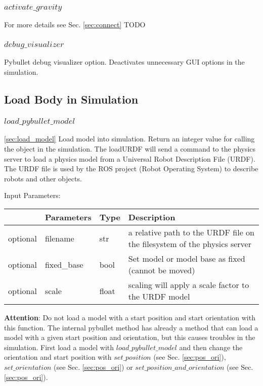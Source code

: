 \documentclass[
	ngerman,
	accentcolor=9c,%
	type=intern,
	marginpar=false
	]{tudapub}
\begin{document}
\subsubsection{$activate\_gravity$}
\noindent For more details see Sec. \ref{sec:connect} TODO


\subsubsection{$debug\_visualizer$}
\noindent Pybullet debug visualizer option. Deactivates unnecessary GUI options in the simulation.

\vspace{0.5cm} 




\subsection{Load Body in Simulation}
\subsubsection{$load\_pybullet\_model$}
\ref{sec:load_model}
\noindent Load model into simulation. Return an integer value for calling the object in the simulation. The loadURDF will send a command to the physics server to load a physics model from a Universal Robot Description File (URDF). The URDF file is used by the ROS project (Robot Operating System) to describe robots and other objects.


\vspace{0.5cm}
\noindent Input Parameters:
\vspace{0.5cm}

\begin{tabular}{|p{}|p{}|p{}| p{}|}
\hline
 & \textbf{Parameters} & \textbf{Type} & \textbf{Description} \\
\hline
optional & filename & str & a relative path to the URDF file on the filesystem of the physics server\\
\hline
optional & fixed\_base & bool & Set model or model base as fixed (cannot be moved)\\
\hline
optional & scale & float & scaling will apply a scale factor to the URDF model\\
\hline
\end{tabular}
\vspace{0.5cm}


\noindent \textbf{Attention}: Do not load a model with a start position and start orientation with this function. The internal pybullet method has already a method that can load a model with a given start position and orientation, but this causes troubles in the simulation. First load a model with $load\_pybullet\_model$ and then change the orientation and start position with $set\_position$ (see Sec. \ref{sec:pos_ori}),  $set\_orientation$ (see Sec. \ref{sec:pos_ori}) or $set\_position\_and\_orientation$ (see Sec. \ref{sec:pos_ori}). 
\end{document}
